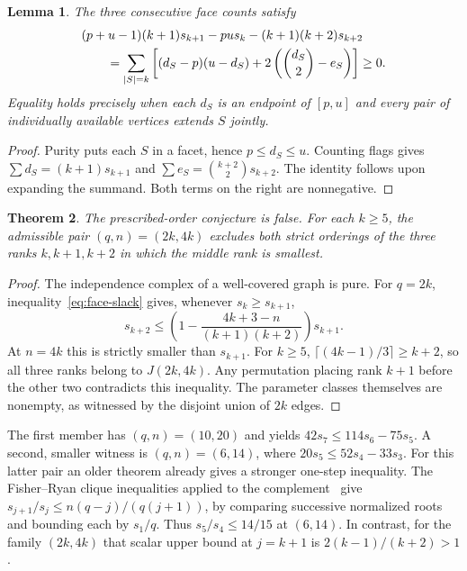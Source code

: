 \documentclass[11pt,a4paper]{article}
\newtheorem{theorem}{Theorem}[section]
\newtheorem{lemma}[theorem]{Lemma}
\theoremstyle{remark}\newtheorem{remark}[theorem]{Remark}
\numberwithin{equation}{section}
\begin{document}
\begin{lemma}\label{lem:face-slack}
The three consecutive face counts satisfy
\begin{align}
 &(p+u-1)(k+1)s_{k+1}-pu s_k-(k+1)(k+2)s_{k+2}\notag\\
 &\qquad=\sum_{|S|=k}\left[(d_S-p)(u-d_S)
          +2\left(\binom{d_S}{2}-e_S\right)\right]\ge0.
 \label{eq:face-slack}
\end{align}
Equality holds precisely when each $d_S$ is an endpoint of $[p,u]$ and
every pair of individually available vertices extends $S$ jointly.
\end{lemma}
\begin{proof}
Purity puts each $S$ in a facet, hence $p\le d_S\le u$.
Counting flags gives $\sum d_S=(k+1)s_{k+1}$ and
$\sum e_S=\binom{k+2}{2}s_{k+2}$. The identity follows upon expanding the
summand. Both terms on the right are nonnegative.
\end{proof}

\begin{theorem}\label{thm:fixedroller}
The prescribed-order conjecture is false. For each $k\ge5$, the admissible
pair $(q,n)=(2k,4k)$ excludes both strict orderings of the three ranks
$k,k+1,k+2$ in which the middle rank is smallest.
\end{theorem}
\begin{proof}
The independence complex of a well-covered graph is pure. For $q=2k$,
inequality~\eqref{eq:face-slack} gives, whenever $s_k\ge s_{k+1}$,
\[
 s_{k+2}\le \left(1-\frac{4k+3-n}{(k+1)(k+2)}\right)s_{k+1}.
\]
At $n=4k$ this is strictly smaller than $s_{k+1}$. For $k\ge5$,
$\lceil(4k-1)/3\rceil\ge k+2$, so all three ranks belong to $J(2k,4k)$.
Any permutation placing rank $k+1$ before the other two contradicts this
inequality. The parameter classes themselves are nonempty, as witnessed
by the disjoint union of $2k$ edges.
\end{proof}

The first member has $(q,n)=(10,20)$ and yields
$42s_7\le114s_6-75s_5$. A second, smaller witness is $(q,n)=(6,14)$,
where $20s_5\le52s_4-33s_3$. For this latter pair an older theorem already
gives a stronger one-step inequality. The Fisher--Ryan clique inequalities
applied to the complement~\cite{FisherRyan} give
$s_{j+1}/s_j\le n(q-j)/(q(j+1))$, by comparing successive normalized
roots and bounding each by $s_1/q$. Thus $s_5/s_4\le14/15$ at $(6,14)$.
In contrast, for the family $(2k,4k)$ that scalar upper bound at $j=k+1$
is $2(k-1)/(k+2)>1$.
\end{document}
